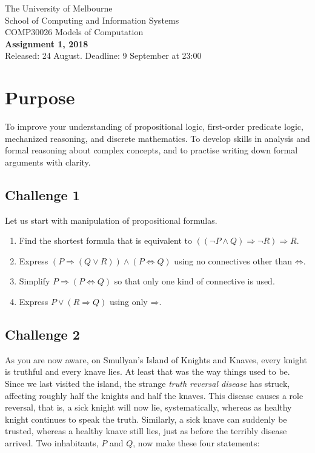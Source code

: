 \documentclass[12pt]{article}
\newcommand{\impl}{\mathbin{\Rightarrow}}
\newcommand{\biim}{\mathbin{\Leftrightarrow}}
\begin{document}
\begin{center}
{\sc The University of Melbourne
\\
School of Computing and Information Systems
\\ 
COMP30026 Models of Computation}
\bigskip \\
{\Large\bf Assignment 1, 2018}
\bigskip \\
{\large Released: 24 August.  Deadline: 9 September at 23:00}
\end{center}

\section*{Purpose}
To improve your understanding of propositional logic, first-order 
predicate logic, mechanized reasoning, and discrete mathematics.
To develop skills in analysis and formal reasoning about complex concepts,
and to practise writing down formal arguments with clarity.


\subsection*{Challenge 1}
Let us start with manipulation of propositional formulas.
\begin{enumerate}
\setlength{\itemsep}{-0.5ex}
\item
Find the shortest formula that is equivalent to
$((\neg P \land Q) \impl \neg R) \impl R$.
\item
Express $(P \impl (Q \lor R)) \land (P \biim Q)$ using no connectives
other than $\biim$.
\item
Simplify $P \impl (P \biim Q)$ so that only one kind of connective is used.
\item
Express $P \lor (R \impl Q)$ using only $\impl$.
\end{enumerate}

\subsection*{Challenge 2}
As you are now aware, on Smullyan's Island of Knights and Knaves, 
every knight is truthful and every knave lies.
At least that was the way things used to be.
Since we last visited the island, the strange \emph{truth reversal disease} 
has struck, affecting roughly half the knights and half the knaves.
This disease causes a role reversal, that is, a sick knight will now lie,
systematically, whereas as healthy knight continues to speak the truth.
Similarly, a sick knave can suddenly be trusted, whereas a healthy
knave still lies, just as before the terribly disease arrived.
%
Two inhabitants, $P$ and $Q$, now make these four statements:
\bigskip
\end{document}
